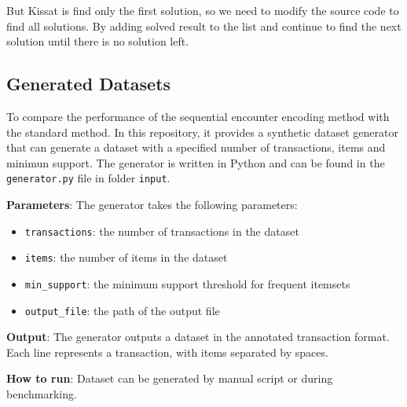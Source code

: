 But Kissat is find only the first solution, so we need to modify the source code to find all solutions.
By adding solved result to the list and continue to find the next solution until there is no solution left.

\subsection{Generated Datasets}
To compare the performance of the sequential encounter encoding method with the standard method.
In this repository, it provides a synthetic dataset generator that can generate a dataset with a specified number of transactions, items and minimun support.
The generator is written in Python and can be found in the \texttt{generator.py} file in folder \texttt{input}.
\begin{flushleft}
    \textbf{Parameters}: The generator takes the following parameters:
\end{flushleft}
\begin{itemize}
    \item \texttt{transactions}: the number of transactions in the dataset
    \item \texttt{items}: the number of items in the dataset
    \item \texttt{min\_support}: the minimum support threshold for frequent itemsets
    \item \texttt{output\_file}: the path of the output file
\end{itemize}

\begin{flushleft}
    \textbf{Output}: The generator outputs a dataset in the annotated transaction format.
    Each line represents a transaction, with items separated by spaces.
\end{flushleft}

\begin{flushleft}
    \textbf{How to run}: Dataset can be generated by manual script or during benchmarking.
\end{flushleft}

